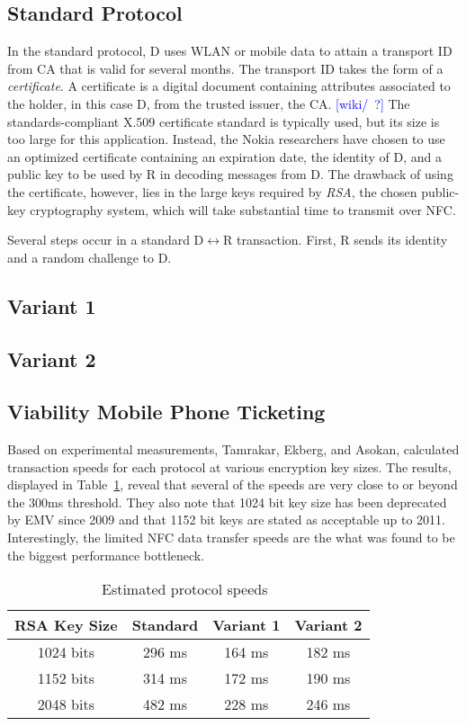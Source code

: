 \documentclass{sig-alternate}
\begin{document}
\subsection{Standard Protocol}
In the standard protocol, D uses WLAN or mobile data to attain a transport ID from CA that is valid for several months. The transport ID takes the form of a \textit{certificate}. A certificate is a digital document containing attributes associated to the holder, in this case D, from the trusted issuer, the CA. \textcolor{blue}{[wiki/~\cite{crypto}?]} The standards-compliant X.509 certificate standard is typically used, but its size is too large for this application. Instead, the Nokia researchers have chosen to use an optimized certificate containing an expiration date, the identity of D, and a public key to be used by R in decoding messages from D. The drawback of using the certificate, however, lies in the large keys required by \textit{RSA}, the chosen public-key cryptography system, which will take substantial time to transmit over NFC.
 
Several steps occur in a standard D$\leftrightarrow$R transaction. First, R sends its identity and a random challenge to D.

\subsection{Variant 1}

\subsection{Variant 2}

\subsection{Viability Mobile Phone Ticketing}
Based on experimental measurements, Tamrakar, Ekberg, and Asokan, calculated transaction speeds for each protocol at various encryption key sizes. The results, displayed in Table~\ref{tab:speedTable}, reveal that several of the speeds are very close to or beyond the 300ms threshold. They also note that 1024 bit key size has been deprecated by EMV since 2009 and that 1152 bit keys are stated as acceptable up to 2011. Interestingly, the limited NFC data transfer speeds are the what was found to be the biggest performance bottleneck. 

\begin{table}[h!]
  \centering
  \caption{Estimated protocol speeds~\cite{Ticket2011}}
  \label{tab:speedTable}
  \begin{tabular}{c|c|c|c}
    RSA Key Size & Standard & Variant 1 & Variant 2\\
    \hline
    1024 bits & 296 ms & 164 ms & 182 ms\\
    1152 bits & 314 ms & 172 ms & 190 ms\\
    2048 bits & 482 ms & 228 ms & 246 ms\\    
  \end{tabular}
\end{table}
\end{document}
